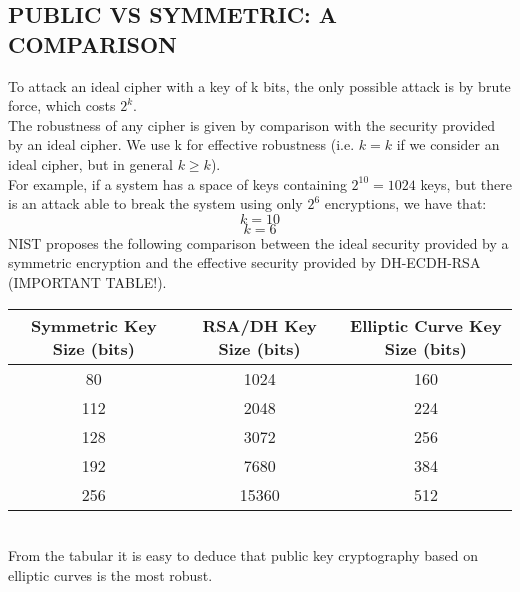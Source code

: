 \documentclass[a4paper, 10pt, titlepage]{article}
\begin{document}
\subsection{PUBLIC VS SYMMETRIC: A COMPARISON}
To attack an ideal cipher with a key of k bits, the only possible attack is by brute force, which costs $2^k$. \\
The robustness of any cipher is given by comparison with the security provided by an ideal cipher. We use k for effective robustness (i.e. $k = k$ if we consider an ideal cipher, but in general $k \geq k$). \\
For example, if a system has a space of keys containing $2^{10} = 1024$ keys, but there is an attack able to break the system using only $2^6$ encryptions, we have that:
$$k = 10$$
$$k =6$$
NIST proposes the following comparison between the ideal security provided by a symmetric encryption and the effective security provided by DH-ECDH-RSA (IMPORTANT TABLE!).\medskip \\
\begin{tabular}{|c|c|c|}\hline
Symmetric Key Size (bits) & RSA/DH Key Size (bits) & Elliptic Curve Key Size (bits) \\ \hline
80 & 1024 & 160 \\ 
112 & 2048 & 224 \\
128 & 3072 & 256 \\
192 & 7680 & 384 \\
256 & 15360 & 512 \\ \hline
\end{tabular} \medskip \\
From the tabular it is easy to deduce that public key cryptography based on elliptic curves is the most robust.

\newpage
\end{document}
